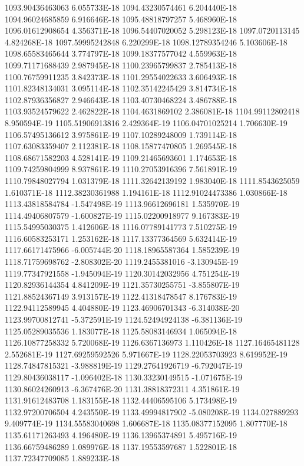 1093.90436463063  6.055733E-18
1094.43230574461  6.204440E-18
1094.96024685859  6.916646E-18
1095.48818797257  5.468960E-18
1096.01612908654  4.356371E-18
1096.54407020052  5.298123E-18
1097.0720113145  4.824268E-18
1097.59995242848  6.220299E-18
1098.12789354246  5.103606E-18
1098.65583465644  3.774797E-18
1099.18377577042  4.559963E-18
1099.71171688439  2.987945E-18
1100.23965799837  2.785413E-18
1100.76759911235  3.842373E-18
1101.29554022633  3.606493E-18
1101.82348134031  3.095114E-18
1102.35142245429  3.814734E-18
1102.87936356827  2.946643E-18
1103.40730468224  3.486788E-18
1103.93524579622  2.462822E-18
1104.4631869102  2.386081E-18
1104.99112802418  8.950594E-19
1105.51906913816  2.429364E-19
1106.04701025214  1.706630E-19
1106.57495136612  3.975861E-19
1107.10289248009  1.739114E-18
1107.63083359407  2.112381E-18
1108.15877470805  1.269545E-18
1108.68671582203  4.528141E-19
1109.21465693601  1.174653E-18
1109.74259804999  8.937861E-19
1110.27053916396  7.561891E-19
1110.79848027794  1.031379E-18
1111.32642139192  1.983040E-18
1111.8543625059  1.610371E-18
1112.38230361988  1.194161E-18
1112.91024473386  1.030866E-18
1113.43818584784  -1.547498E-19
1113.96612696181  1.535970E-19
1114.49406807579  -1.600827E-19
1115.02200918977  9.167383E-19
1115.54995030375  1.412606E-18
1116.07789141773  7.510275E-19
1116.60583253171  1.253162E-18
1117.13377364569  5.632414E-19
1117.66171475966  -6.005744E-20
1118.18965587364  1.585239E-19
1118.71759698762  -2.808302E-20
1119.2455381016  -3.130945E-19
1119.77347921558  -1.945094E-19
1120.30142032956  4.751254E-19
1120.82936144354  4.841209E-19
1121.35730255751  -3.855807E-19
1121.88524367149  3.913157E-19
1122.41318478547  8.176783E-19
1122.94112589945  4.404880E-19
1123.46906701343  -6.314038E-20
1123.99700812741  -5.372591E-19
1124.52494924138  -6.381136E-19
1125.05289035536  1.183077E-18
1125.58083146934  1.065094E-18
1126.10877258332  5.720068E-19
1126.6367136973  1.110426E-18
1127.16465481128  2.552681E-19
1127.69259592526  5.971667E-19
1128.22053703923  8.619952E-19
1128.74847815321  -3.988819E-19
1129.27641926719  -6.792047E-19
1129.80436038117  -1.096402E-18
1130.33230149515  -1.071675E-19
1130.86024260913  -6.367476E-20
1131.38818372311  4.351861E-19
1131.91612483708  1.183155E-18
1132.44406595106  5.173498E-19
1132.97200706504  4.243550E-19
1133.49994817902  -5.080208E-19
1134.027889293  9.409774E-19
1134.55583040698  1.606687E-18
1135.08377152095  1.807770E-18
1135.61171263493  4.196480E-19
1136.13965374891  5.495716E-19
1136.66759486289  1.089976E-18
1137.19553597687  1.522801E-18
1137.72347709085  1.889233E-18
